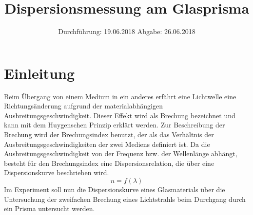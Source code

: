

\subject{V402}
\title{Dispersionsmessung am Glasprisma}
\date{%
  Durchführung: 19.06.2018
  \hspace{3em}
  Abgabe: 26.06.2018
}



\maketitle
\thispagestyle{empty}
\tableofcontents
\newpage

\section{Einleitung}

Beim Übergang von einem Medium in ein anderes erfährt eine Lichtwelle eine Richtungsänderung
aufgrund der materialabhängigen Ausbreitungsgeschwindigkeit.
Dieser Effekt wird als Brechung bezeichnet und kann mit dem Huygenschen Prinzip erklärt werden.
Zur Beschreibung der Brechung wird der Brechungsindex benutzt, der als das Verhältnis
der Ausbreitungsgeschwindigkeiten der zwei Mediens definiert ist.
Da die Ausbreitungsgeschwindigkeit von der Frequenz bzw. der Wellenlänge abhängt,
besteht für den Brechungsindex eine Dispersionsrelation,
die über eine Dispersionskurve beschrieben wird.
\begin{equation*}
  n = f(\lambda)
\end{equation*}
Im Experiment soll nun die Dispersionskurve eines Glasmaterials
über die Untersuchung der zweifachen Brechung eines Lichtstrahls beim Durchgang durch ein Prisma untersucht werden.






\printbibliography{}


